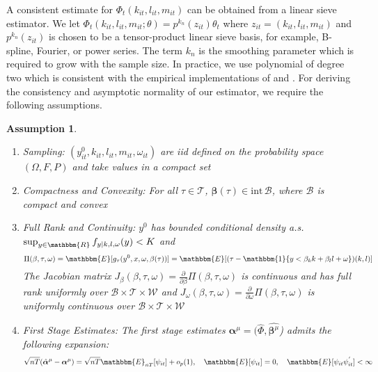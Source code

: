 \documentclass[11pt]{article}
\newtheorem{assump}{Assumption}[section]
\begin{document}
A consistent estimate for $\Phi_{t}(k_{it}, l_{it}, m_{it})$ can be obtained from a linear sieve estimator. We let $\Phi_{t}(k_{it}, l_{it}, m_{it};\theta)=p^{k_{n}}(z_{it})\theta_{t}$ where $z_{it}=(k_{it}, l_{it}, m_{it})$ and $p^{k_{n}}(z_{it})$ is chosen to be a tensor-product linear sieve basis, for example, B-spline, Fourier, or power series. The term $k_{n}$ is the smoothing parameter which is required to grow with the sample size.  In practice, we use polynomial of degree two which is consistent with the empirical implementations of \cite{Levinsohn2003} and \cite{Ackerberg2015}. For deriving the consistency and asymptotic normality of our estimator, we require the following assumptions.
\begin{assump} \label{asymptotics1}
\leavevmode
	\begin{enumerate}[label=(\alph*)]
		\item Sampling: $(y^{0}_{it}, k_{it}, l_{it}, m_{it}, \omega_{it})$ are iid defined on the probability space $(\Omega, F, P)$ and take values in a compact set
		\item Compactness and Convexity: For all $\tau\in \mathcal{T}$, $\boldsymbol{\beta}(\tau)\in \text{int} \, \mathcal{B}$, where $\mathcal{B}$ is compact and convex
		\item Full Rank and Continuity: $y^{0}$ has bounded conditional density a.s. $\sup_{y\in \mathbbm{R}}f_{y|k,l,\omega}(y)<K$ and
		\begin{equation*}
		\Pi(\beta, \tau, \omega)=\mathbbm{E}[g_{\tau}(y^{0},x,\omega,\beta(\tau))]=\mathbbm{E}[(\tau-\mathbbm{1}\{y<\beta_{k}k+\beta_{l}l+\omega\})(k,l)]
		\end{equation*}
		The Jacobian matrix $J_{\beta}(\beta, \tau, \omega)=\frac{\partial}{\partial\beta}\Pi(\beta, \tau, \omega)$ is continuous and has full rank uniformly over $\mathcal{B}\times\mathcal{T}\times\mathcal{W}$ and $J_{\omega}(\beta, \tau, \omega)=\frac{\partial}{\partial\omega}\Pi(\beta, \tau, \omega)$ is uniformly continuous over $\mathcal{B}\times\mathcal{T}\times\mathcal{W}$ 
		\item First Stage Estimates: The first stage estimates $\boldsymbol{\alpha}^{\mu}=(\hat{\Phi}, \hat{\boldsymbol{\beta}^{\mu}}$) admits the following expansion:
		\begin{equation*}
			\sqrt{nT}(\hat{\boldsymbol{\alpha}}^{\mu}-\boldsymbol{\alpha}^{\mu})=\sqrt{nT}\mathbbm{E}_{nT}[\psi_{it}]+o_{p}(1),\quad \mathbbm{E}[\psi_{it}]=0, \quad \mathbbm{E}[\psi_{it}\psi_{it}^{'}]<\infty
		\end{equation*}
	\end{enumerate}
\end{assump}
\end{document}
